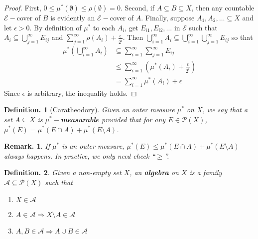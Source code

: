 \documentclass[12pt, a4paper]{memoir}
\theoremstyle{nonumberplain}
\newtheorem{definition}{Definition.}
\newtheorem{remark}{Remark.}
\newtheorem{proof}{Proof}
\begin{document}
\begin{proof}
    First, $0\leq\mu^*(\emptyset)\leq\rho(\emptyset)=0$.
    Second, if $A\subseteq B\subseteq X$, then any countable $\mathcal{E}-$cover of $B$ is evidently an $\mathcal{E}-$cover of $A$.
    Finally, suppose $A_1,A_2,\ldots\subseteq X$ and let $\epsilon>0$.
    By definition of $\mu^*$ to each $A_i$, get $E_{i1},E_{i2},\ldots$ in $\mathcal{E}$ such that $A_i\subseteq\bigcup_{j=1}^\infty E_{ij}$ and $\sum_{j=1}^\infty \rho(A_i)+\frac{\epsilon}{2^i}$.
    Then $\bigcup_{i=1}^\infty A_i\subseteq\bigcup_{i=1}^\infty\bigcup_{j=1}^\infty E_{ij}$ so that
    \begin{align*}
        \mu^*\left(\bigcup\limits_{i=1}^\infty A_i\right) &\subseteq\sum\limits_{i=1}^\infty\sum\limits_{j=1}^\infty E_{ij}\\
                                                          &\leq \sum\limits_{i=1}^\infty\left(\mu^*(A_i)+\frac{\epsilon}{2^i}\right)\\
                                                          &= \sum\limits_{i=1}^\infty \mu^*(A_i)+\epsilon
    \end{align*}
    Since $\epsilon$ is arbitrary, the inequality holds.
\end{proof}
\begin{definition}[Caratheodory]
    Given an outer measure $\mu^*$ on $X$, we say that a set $A\subseteq X$ is \textbf{$\mu^*-$measurable} provided that for any $E\in\mathcal{P}(X)$, $\mu^*(E)=\mu^*(E\cap A)+\mu^*(E\setminus A)$.
\end{definition}
\begin{remark}
    If $\mu^*$ is an outer measure, $\mu^*(E)\leq\mu^*(E\cap A)+\mu^*(E\setminus A)$ always happens.
    In practice, we only need check ``$\geq$''.
\end{remark}
\begin{definition}
    Given a non-empty set $X$, an \textbf{algebra} on $X$ is a family $\mathcal{A}\subseteq\mathcal{P}(X)$ such that
    \begin{enumerate}[nolistsep,label=(\roman*)]
        \item $X\in\mathcal{A}$
        \item $A\in\mathcal{A}\Rightarrow X\setminus A\in\mathcal{A}$
        \item $A,B\in\mathcal{A}\Rightarrow A\cup B\in\mathcal{A}$
    \end{enumerate}
\end{definition}
\end{document}
